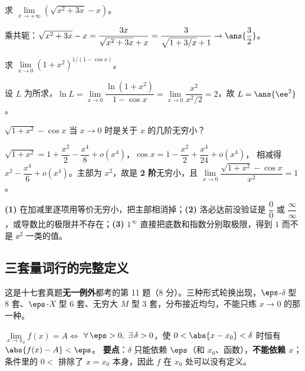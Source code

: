 \begin{exa}
求 $\lim\limits_{x\to+\infty}\left(\sqrt{x^2+3x}-x\right)$。
\end{exa}
\begin{solution}
乘共轭：$\sqrt{x^2+3x}-x=\dfrac{3x}{\sqrt{x^2+3x}+x}=\dfrac{3}{\sqrt{1+3/x}+1}\to\ans{\dfrac32}$。
\end{solution}

\begin{exa}
求 $\lim\limits_{x\to0}(1+x^2)^{1/(1-\cos x)}$。
\end{exa}
\begin{solution}
设 $L$ 为所求，$\ln L=\lim\limits_{x\to0}\dfrac{\ln(1+x^2)}{1-\cos x}
=\lim\limits_{x\to0}\dfrac{x^2}{x^2/2}=2$，故 $L=\ans{\ee^2}$。
\end{solution}

\begin{exa}[无穷小的阶]
$\sqrt{1+x^2}-\cos x$ 当 $x\to0$ 时是关于 $x$ 的几阶无穷小？
\end{exa}
\begin{solution}
$\sqrt{1+x^2}=1+\dfrac{x^2}{2}-\dfrac{x^4}{8}+o(x^4)$，$\cos x=1-\dfrac{x^2}{2}+\dfrac{x^4}{24}+o(x^4)$，
相减得 $x^2-\dfrac{x^4}{6}+o(x^4)$。主部为 $x^2$，故是 \textbf{2 阶}无穷小，且
$\lim\limits_{x\to0}\dfrac{\sqrt{1+x^2}-\cos x}{x^2}=1$。
\end{solution}

\begin{warnbox}[本章最常丢分的三处]
\textbf{(1)} 在加减里逐项用等价无穷小，把主部相消掉；\textbf{(2)} 洛必达前没验证是 $\dfrac00$ 或 $\dfrac{\infty}{\infty}$，或导数比的极限并不存在；\textbf{(3)} $1^\infty$ 直接把底数和指数分别取极限，得到 $1$ 而不是 $\ee^2$ 一类的值。
\end{warnbox}

\subsection{三套量词行的完整定义}

\noindent 这是十七套真题\textbf{无一例外}都考的第 11 题（8 分）。三种形式轮换出现，$\eps$-$\delta$ 型 8 套、$\eps$-$X$ 型 6 套、无穷大 $M$ 型 3 套，分布接近均匀，不能只练 $x\to0$ 的那一种。

\begin{keypoint}
$\lim\limits_{x\to x_0}f(x)=A \iff$
$\forall\,\eps>0,\ \exists\,\delta>0$，使 $0<\abs{x-x_0}<\delta$ 时恒有 $\abs{f(x)-A}<\eps$。
\textbf{要点}：$\delta$ 只能依赖 $\eps$（和 $x_0$、函数），\textbf{不能依赖 $x$}；条件里的 $0<$ 排除了 $x=x_0$ 本身，因此 $f$ 在 $x_0$ 处可以没有定义。
\end{keypoint}


